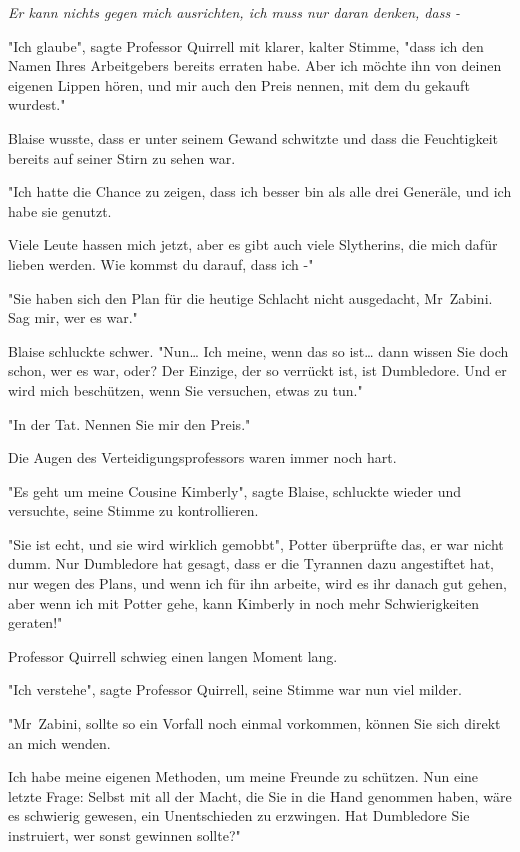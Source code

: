 {\emph{Er kann nichts gegen mich ausrichten, ich muss nur daran denken, dass -}

"Ich glaube", sagte Professor Quirrell mit klarer, kalter Stimme, "dass ich den Namen Ihres Arbeitgebers bereits erraten habe. Aber ich möchte ihn von deinen eigenen Lippen hören, und mir auch den Preis nennen, mit dem du gekauft wurdest."

Blaise wusste, dass er unter seinem Gewand schwitzte und dass die Feuchtigkeit bereits auf seiner Stirn zu sehen war.

"Ich hatte die Chance zu zeigen, dass ich besser bin als alle drei Generäle, und ich habe sie genutzt.

Viele Leute hassen mich jetzt, aber es gibt auch viele Slytherins, die mich dafür lieben werden. Wie kommst du darauf, dass ich -"

"Sie haben sich den Plan für die heutige Schlacht nicht ausgedacht, Mr~Zabini. Sag mir, wer es war."

Blaise schluckte schwer. "Nun… Ich meine, wenn das so ist… dann wissen Sie doch schon, wer es war, oder? Der Einzige, der so verrückt ist, ist Dumbledore. Und er wird mich beschützen, wenn Sie versuchen, etwas zu tun."

"In der Tat. Nennen Sie mir den Preis."

Die Augen des Verteidigungsprofessors waren immer noch hart.

"Es geht um meine Cousine Kimberly", sagte Blaise, schluckte wieder und versuchte, seine Stimme zu kontrollieren.

"Sie ist echt, und sie wird wirklich gemobbt", Potter überprüfte das, er war nicht dumm. Nur Dumbledore hat gesagt, dass er die Tyrannen dazu angestiftet hat, nur wegen des Plans, und wenn ich für ihn arbeite, wird es ihr danach gut gehen, aber wenn ich mit Potter gehe, kann Kimberly in noch mehr Schwierigkeiten geraten!"

Professor Quirrell schwieg einen langen Moment lang.

"Ich verstehe", sagte Professor Quirrell, seine Stimme war nun viel milder.

"Mr~Zabini, sollte so ein Vorfall noch einmal vorkommen, können Sie sich direkt an mich wenden.

Ich habe meine eigenen Methoden, um meine Freunde zu schützen. Nun eine letzte Frage: Selbst mit all der Macht, die Sie in die Hand genommen haben, wäre es schwierig gewesen, ein Unentschieden zu erzwingen. Hat Dumbledore Sie instruiert, wer sonst gewinnen sollte?"

}
